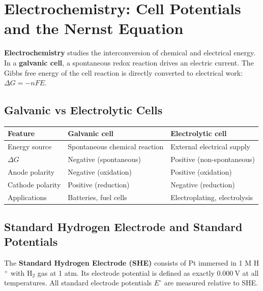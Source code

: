 \documentclass[12pt,a4paper]{article}
\begin{document}
\section{Electrochemistry: Cell Potentials and the Nernst Equation}

\begin{tcolorbox}[defbox]
\textbf{Electrochemistry} studies the interconversion of chemical and electrical energy. In a \textbf{galvanic cell}, a spontaneous redox reaction drives an electric current. The Gibbs free energy of the cell reaction is directly converted to electrical work: $\Delta G = -nFE$.
\end{tcolorbox}

\subsection{Galvanic vs Electrolytic Cells}
\begin{tabularx}{\linewidth}{|B{2.6cm}|Y|Y|}
\hline
\textbf{Feature} & \textbf{Galvanic cell} & \textbf{Electrolytic cell} \\
\hline
Energy source & Spontaneous chemical reaction & External electrical supply \\
\hline
$\Delta G$ & Negative (spontaneous) & Positive (non-spontaneous) \\
\hline
Anode polarity & Negative (oxidation) & Positive (oxidation) \\
\hline
Cathode polarity & Positive (reduction) & Negative (reduction) \\
\hline
Applications & Batteries, fuel cells & Electroplating, electrolysis \\
\hline
\end{tabularx}

\subsection{Standard Hydrogen Electrode and Standard Potentials}
\begin{tcolorbox}[defbox]
The \textbf{Standard Hydrogen Electrode (SHE)} consists of Pt immersed in 1 M H$^+$ with H$_2$ gas at 1 atm. Its electrode potential is defined as exactly $0.000\ \mathrm{V}$ at all temperatures. All standard electrode potentials $E^\circ$ are measured relative to SHE.
\end{tcolorbox}
\end{document}
